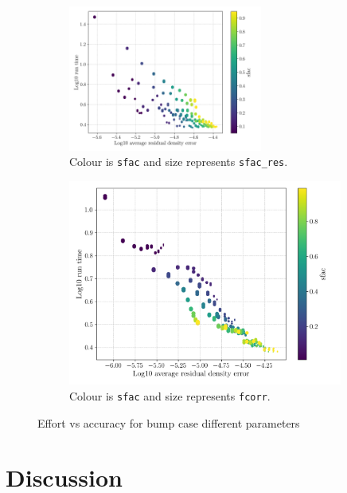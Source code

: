 \documentclass{article}
\begin{document}
\begin{figure}[H]
    \begin{subfigure}{0.49\textwidth}
        \centering
        \includegraphics[width=0.7\textwidth]{figures/effort_vs_accuracy_sfac_res.png}
        \caption{Colour is \texttt{sfac} and size represents \texttt{sfac\_res}.}
        \label{fig:effort_vs_accuracy_sfac_res}
    \end{subfigure}
    \begin{subfigure}{0.49\textwidth}
        \centering
        \includegraphics[width=0.99\textwidth]{figures/effort_vs_accuracy_fcorr.png}
        \caption{Colour is \texttt{sfac} and size represents \texttt{fcorr}.}
        \label{fig:effort_vs_accuracy_fcorr}
    \end{subfigure}
    \caption{Effort vs accuracy for bump case different parameters}
\end{figure}

\section{Discussion}
\end{document}
